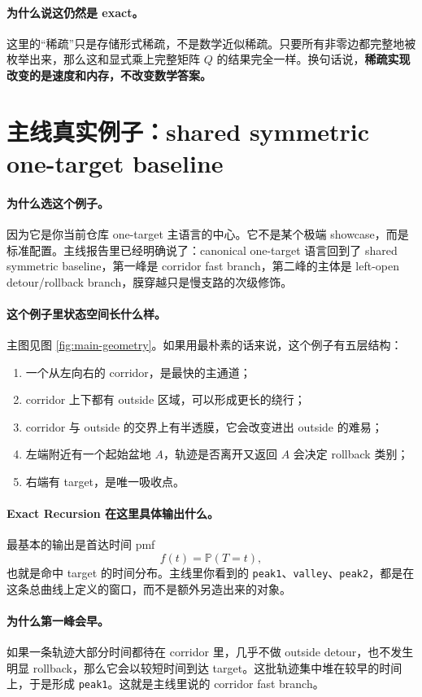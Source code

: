 \documentclass[11pt,fontset=fandol]{ctexart}
\begin{document}
\paragraph{为什么说这仍然是 exact。}
这里的“稀疏”只是存储形式稀疏，不是数学近似稀疏。只要所有非零边都完整地被枚举出来，那么这和显式乘上完整矩阵 $Q$ 的结果完全一样。换句话说，\textbf{稀疏实现改变的是速度和内存，不改变数学答案。}

\section{主线真实例子：shared symmetric one-target baseline}
\paragraph{为什么选这个例子。}
因为它是你当前仓库 one-target 主语言的中心。它不是某个极端 showcase，而是标准配置。主线报告里已经明确说了：canonical one-target 语言回到了 shared symmetric baseline，第一峰是 corridor fast branch，第二峰的主体是 left-open detour/rollback branch，膜穿越只是慢支路的次级修饰。

\paragraph{这个例子里状态空间长什么样。}
主图见图 \ref{fig:main-geometry}。如果用最朴素的话来说，这个例子有五层结构：
\begin{enumerate}
  \item 一个从左向右的 corridor，是最快的主通道；
  \item corridor 上下都有 outside 区域，可以形成更长的绕行；
  \item corridor 与 outside 的交界上有半透膜，它会改变进出 outside 的难易；
  \item 左端附近有一个起始盆地 $A$，轨迹是否离开又返回 $A$ 会决定 rollback 类别；
  \item 右端有 target，是唯一吸收点。
\end{enumerate}

\paragraph{Exact Recursion 在这里具体输出什么。}
最基本的输出是首达时间 pmf
\[
  f(t)=\mathbb P(T=t),
\]
也就是命中 target 的时间分布。主线里你看到的 \texttt{peak1}、\texttt{valley}、\texttt{peak2}，都是在这条总曲线上定义的窗口，而不是额外另造出来的对象。

\paragraph{为什么第一峰会早。}
如果一条轨迹大部分时间都待在 corridor 里，几乎不做 outside detour，也不发生明显 rollback，那么它会以较短时间到达 target。这批轨迹集中堆在较早的时间上，于是形成 \texttt{peak1}。这就是主线里说的 corridor fast branch。
\end{document}
